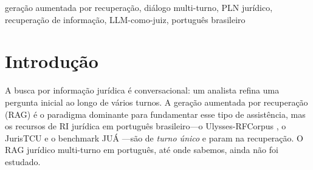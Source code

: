 \documentclass[conference]{IEEEtran}
\begin{document}
\begin{IEEEkeywords}
geração aumentada por recuperação, diálogo multi-turno, PLN jurídico,
recuperação de informação, LLM-como-juiz, português brasileiro
\end{IEEEkeywords}

\section{Introdução}
A busca por informação jurídica é conversacional: um analista refina uma
pergunta inicial ao longo de vários turnos. A geração aumentada por recuperação
(RAG) \cite{Lewis2020RAG} é o paradigma dominante para fundamentar esse tipo de
assistência, mas os recursos de RI jurídica em português brasileiro---o
Ulysses-RFCorpus \cite{Vitorio2024}, o JurisTCU \cite{Fernandes2026JurisTCU} e o
benchmark JU\'A \cite{Pereira2026JUA}---são de \emph{turno único} e param na
recuperação. O RAG jurídico multi-turno em português, até onde sabemos, ainda
não foi estudado.
\end{document}
